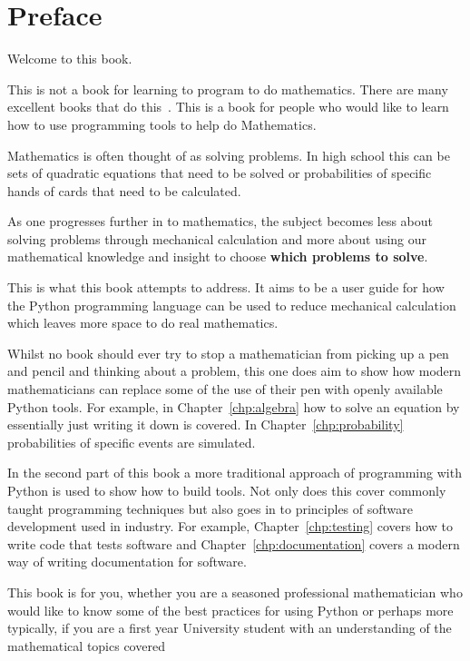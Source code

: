 \chapter*{Preface}


Welcome to this book.

This is not a book for learning to program to do mathematics. There are
many excellent books that do this~\cite{bautista2014mathematics, morley2022applying,  saha2015doing}. This is a book for people who would
like to learn how to use programming tools to help do Mathematics.

Mathematics is often thought of as solving problems. In high school this can
be sets of quadratic equations that need to be solved or probabilities of
specific hands of cards that need to be calculated.

As one progresses further in to mathematics, the subject becomes less about
solving problems through mechanical calculation and more about using our
mathematical knowledge and insight to choose \textbf{which problems to solve}.

This is what this book attempts to address. It aims to be a user guide for how
the Python programming language can be used to reduce mechanical calculation
which leaves more space to do real mathematics.

Whilst no book should ever try to stop a mathematician from picking up a pen and
pencil and thinking about a problem, this one does aim to show how modern
mathematicians can replace some of the use of their pen with openly available
Python tools. For example, in Chapter~\ref{chp:algebra} how to solve an equation by essentially
just writing it down is covered. In Chapter~\ref{chp:probability} probabilities
of specific events are simulated.

In the second part of this book a more traditional approach of programming with
Python is used to show how to build tools. Not only does this cover commonly
taught programming techniques but also goes in to principles of software
development used in industry. For example, Chapter~\ref{chp:testing} covers how
to write code that tests software and Chapter~\ref{chp:documentation} covers a
modern way of writing documentation for software.

This book is for you, whether you are a seasoned professional mathematician who
would like to know some of the best practices for using Python or perhaps more
typically, if you are a first year University student with an understanding of
the mathematical topics covered

